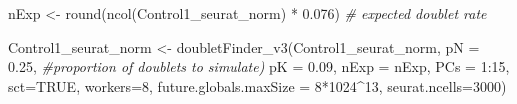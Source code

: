 \documentclass[
  letterpaper,
  DIV=11,
  numbers=noendperiod]{scrartcl}
\newenvironment{Shaded}{\begin{snugshade}}{\end{snugshade}}
\newcommand{\AttributeTok}[1]{\textcolor[rgb]{0.49,0.56,0.16}{#1}}
\newcommand{\CommentTok}[1]{\textcolor[rgb]{0.38,0.63,0.69}{\textit{#1}}}
\newcommand{\ConstantTok}[1]{\textcolor[rgb]{0.53,0.00,0.00}{#1}}
\newcommand{\DecValTok}[1]{\textcolor[rgb]{0.25,0.63,0.44}{#1}}
\newcommand{\FloatTok}[1]{\textcolor[rgb]{0.25,0.63,0.44}{#1}}
\newcommand{\FunctionTok}[1]{\textcolor[rgb]{0.02,0.16,0.49}{#1}}
\newcommand{\NormalTok}[1]{\textcolor[rgb]{0.00,0.44,0.13}{#1}}
\newcommand{\OtherTok}[1]{\textcolor[rgb]{0.00,0.44,0.13}{#1}}
\newcommand{\SpecialCharTok}[1]{\textcolor[rgb]{0.25,0.44,0.63}{#1}}
\begin{document}
\begin{Shaded}
\begin{Highlighting}[]
\NormalTok{nExp }\OtherTok{\textless{}{-}} \FunctionTok{round}\NormalTok{(}\FunctionTok{ncol}\NormalTok{(Control1\_seurat\_norm) }\SpecialCharTok{*} \FloatTok{0.076}\NormalTok{)  }\CommentTok{\# expected doublet rate}
\end{Highlighting}
\end{Shaded}

\begin{Shaded}
\begin{Highlighting}[]
\NormalTok{Control1\_seurat\_norm }\OtherTok{\textless{}{-}} \FunctionTok{doubletFinder\_v3}\NormalTok{(Control1\_seurat\_norm,}
                                                  \AttributeTok{pN =} \FloatTok{0.25}\NormalTok{, }\CommentTok{\#proportion of doublets to simulate)}
                                                  \AttributeTok{pK =} \FloatTok{0.09}\NormalTok{, }
                                                  \AttributeTok{nExp =}\NormalTok{ nExp, }
                                                  \AttributeTok{PCs =} \DecValTok{1}\SpecialCharTok{:}\DecValTok{15}\NormalTok{, }
                                                  \AttributeTok{sct=}\ConstantTok{TRUE}\NormalTok{, }
                                                  \AttributeTok{workers=}\DecValTok{8}\NormalTok{, }
                                                  \AttributeTok{future.globals.maxSize =} \DecValTok{8}\SpecialCharTok{*}\DecValTok{1024}\SpecialCharTok{\^{}}\DecValTok{13}\NormalTok{,}
                                                  \AttributeTok{seurat.ncells=}\DecValTok{3000}\NormalTok{)}
\end{Highlighting}
\end{Shaded}
\end{document}
